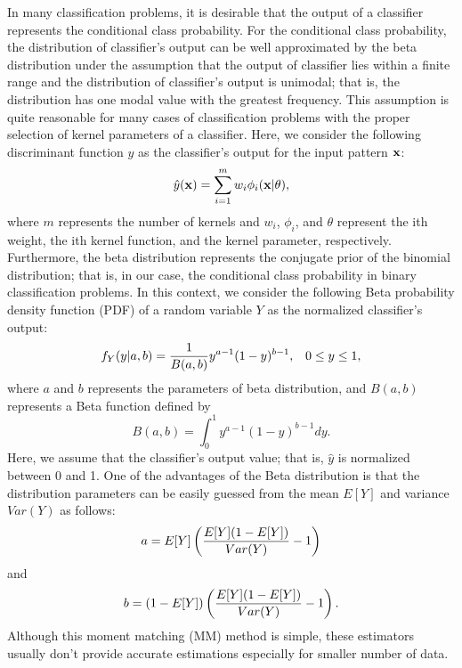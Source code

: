 \documentclass[runningheads,a4paper]{llncs}
\begin{document}
In many classification problems, it is desirable that the output of a classifier represents the conditional class probability.
For the conditional class probability, the distribution of classifier's output can be well approximated by the beta distribution under
the assumption that the output of classifier lies within a finite range and the distribution of classifier's output is unimodal; that is,
the distribution has one modal value with the greatest frequency. This assumption is quite reasonable for many cases of classification problems
with the proper selection of kernel parameters of a classifier.
Here, we consider the following discriminant function $y$ as the classifier's output for the input pattern $\bf x$:
\begin{equation}
\hat{y}({\bf x})=\sum_{i=1}^m w_i\phi_i({\bf x}|\theta),
\label{y_hat}
\end{equation}
where $m$ represents the number of kernels and $w_i$, $\phi_i$, and $\theta$ represent the ith weight, the ith kernel function,
and the kernel parameter, respectively.  Furthermore, the beta distribution represents the conjugate prior of the binomial distribution; that is,
in our case, the conditional class probability in binary classification problems.
In this context, we consider the following Beta probability density function (PDF) of a random variable $Y$ as the normalized classifier's output:
\begin{equation}
f_Y(y|a,b)={1\over{B(a,b)}}y^{a-1}(1-y)^{b-1}, \;\;\; 0\le y\le 1,
\end{equation}
where $a$ and $b$ represents the parameters of beta distribution, and $B(a,b)$ represents a Beta function defined by
\begin{equation}
B(a,b)=\int_0^1 y^{a-1}(1-y)^{b-1}dy.
\end{equation}
Here, we assume that the classifier's output value; that is, $\hat{y}$ is normalized between 0 and 1.
One of the advantages of the Beta distribution is that the distribution parameters can be easily guessed from the mean $E[Y]$
and variance $Var(Y)$ as follows:
\begin{equation}
a=E[Y]\left( {{E[Y](1-E[Y])}\over{Var(Y)}}-1\right)
\end{equation}
and	
\begin{equation}
b=(1-E[Y])\left( {{E[Y](1-E[Y])}\over{Var(Y)}}-1\right).
\end{equation}
Although this moment matching (MM) method is simple, these estimators usually don't provide accurate estimations especially for smaller number of data.
\end{document}
